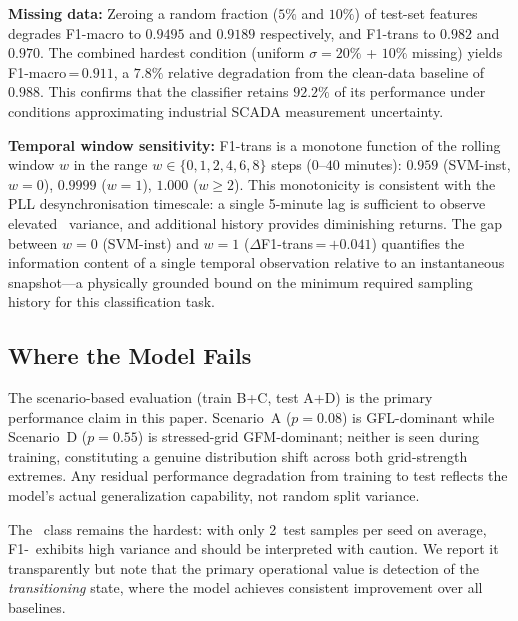 \documentclass[journal]{IEEEtran}
\newcommand{\rocof}{\text{RoCoF}}
\newcommand{\gfl}{\text{GFL}}
\begin{document}
\textbf{Missing data:}
Zeroing a random fraction ($5\%$ and $10\%$) of test-set features
degrades F1-macro to $0.9495$ and $0.9189$ respectively,
and F1-trans to $0.982$ and $0.970$.
The combined hardest condition (uniform $\sigma = 20\%$ + $10\%$ missing)
yields F1-macro\,=\,$0.911$, a $7.8\%$ relative degradation from the
clean-data baseline of $0.988$.
This confirms that the classifier retains $92.2\%$ of its performance
under conditions approximating industrial SCADA measurement uncertainty.

\textbf{Temporal window sensitivity:}
F1-trans is a monotone function of the rolling window $w$ in the range
$w \in \{0, 1, 2, 4, 6, 8\}$ steps ($0$--$40$ minutes):
$0.959$ (SVM-inst, $w=0$), $0.9999$ ($w=1$), $1.000$ ($w \geq 2$).
This monotonicity is consistent with the PLL desynchronisation timescale:
a single 5-minute lag is sufficient to observe elevated \rocof\ variance,
and additional history provides diminishing returns.
The gap between $w=0$ (SVM-inst) and $w=1$ ($\Delta$F1-trans\,=\,$+0.041$)
quantifies the information content of a single temporal observation relative
to an instantaneous snapshot---a physically grounded bound on the minimum
required sampling history for this classification task.

\subsection{Where the Model Fails}

The scenario-based evaluation (train B+C, test A+D) is the primary
performance claim in this paper.
Scenario~A ($p=0.08$) is GFL-dominant while Scenario~D ($p=0.55$) is
stressed-grid GFM-dominant; neither is seen during training, constituting
a genuine distribution shift across both grid-strength extremes.
Any residual performance degradation from training to test reflects the
model's actual generalization capability, not random split variance.

The \gfl\ class remains the hardest: with only 2~test samples per seed
on average, F1-\gfl\ exhibits high variance and should be interpreted
with caution.
We report it transparently but note that the primary operational value
is detection of the \emph{transitioning} state, where the model achieves
consistent improvement over all baselines.
\end{document}
